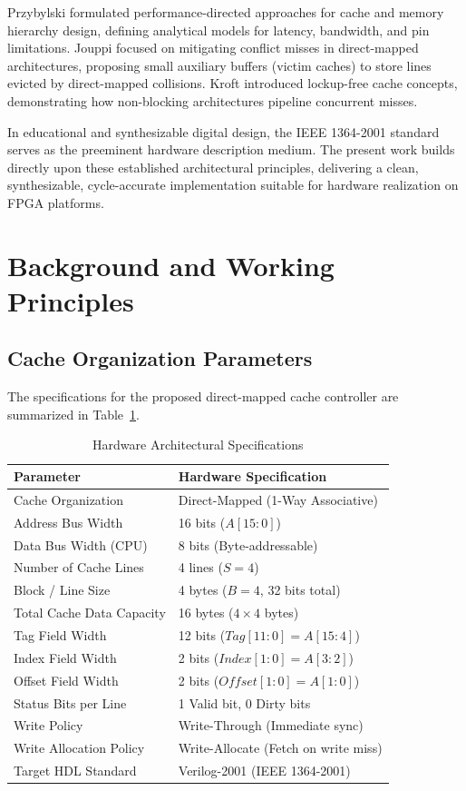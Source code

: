\documentclass[conference]{IEEEtran}
\begin{document}
Przybylski \cite{przybylski1990cache} formulated performance-directed approaches for cache and memory hierarchy design, defining analytical models for latency, bandwidth, and pin limitations. Jouppi \cite{jouppi1990improving} focused on mitigating conflict misses in direct-mapped architectures, proposing small auxiliary buffers (victim caches) to store lines evicted by direct-mapped collisions. Kroft \cite{kroft1981lockup} introduced lockup-free cache concepts, demonstrating how non-blocking architectures pipeline concurrent misses.

In educational and synthesizable digital design, the IEEE 1364-2001 standard \cite{ieee2001verilog} serves as the preeminent hardware description medium. The present work builds directly upon these established architectural principles, delivering a clean, synthesizable, cycle-accurate implementation suitable for hardware realization on FPGA platforms.

\section{Background and Working Principles}

\subsection{Cache Organization Parameters}
The specifications for the proposed direct-mapped cache controller are summarized in Table~\ref{tab:specs}.

\begin{table}[htbp]
\caption{Hardware Architectural Specifications}
\label{tab:specs}
\centering
\begin{tabularx}{\columnwidth}{lX}
\toprule
\textbf{Parameter} & \textbf{Hardware Specification} \\
\midrule
Cache Organization & Direct-Mapped (1-Way Associative) \\
Address Bus Width & 16 bits ($A[15:0]$) \\
Data Bus Width (CPU) & 8 bits (Byte-addressable) \\
Number of Cache Lines & 4 lines ($S = 4$) \\
Block / Line Size & 4 bytes ($B = 4$, 32 bits total) \\
Total Cache Data Capacity & 16 bytes ($4 \times 4$ bytes) \\
Tag Field Width & 12 bits ($Tag[11:0] = A[15:4]$) \\
Index Field Width & 2 bits ($Index[1:0] = A[3:2]$) \\
Offset Field Width & 2 bits ($Offset[1:0] = A[1:0]$) \\
Status Bits per Line & 1 Valid bit, 0 Dirty bits \\
Write Policy & Write-Through (Immediate sync) \\
Write Allocation Policy & Write-Allocate (Fetch on write miss) \\
Target HDL Standard & Verilog-2001 (IEEE 1364-2001) \\
\bottomrule
\end{tabularx}
\end{table}
\end{document}
